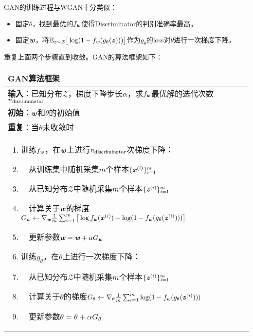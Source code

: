 GAN的训练过程与WGAN十分类似：
\begin{itemize}
	\setlength{\itemsep}{0pt}
    \setlength{\parsep}{0pt}
    \setlength{\parskip}{0pt}
    \item 固定$\theta$，找到最优的$f_{\boldsymbol{\mathit{w}}}$使得Discriminator的判别准确率最高。
    \item 固定$\boldsymbol{\mathit{w}}$，将$\mathbb{E}_{\boldsymbol{\mathit{z}}\sim\mathcal{Z}}\big{[}\log(1-f_{\boldsymbol{\mathit{w}}}(g_{\theta}(\boldsymbol{\mathit{z}})))\big{]}$作为$g_{\theta}$的loss对$\theta$进行一次梯度下降。
\end{itemize}
重复上面两个步骤直到收敛。GAN的算法框架如下：
\begin{center}
\begin{tabularx}{\textwidth}{X}
\toprule 
\textbf{{GAN}算法框架}\\
\midrule
\textbf{输入}：已知分布$\mathcal{Z}$，梯度下降步长$\alpha$，求$f_{\boldsymbol{\mathit{w}}}$最优解的迭代次数$n_{\rm{discriminator}}$\\
\textbf{初始}：$\boldsymbol{\mathit{w}}$和$\theta$的初始值\\
\textbf{重复}：当$\theta$未收敛时\\
\parbox{1\textwidth}{\begin{enumerate}[topsep=0pt]
    \setlength{\itemsep}{0pt}
    \setlength{\parsep}{0pt}
    \setlength{\parskip}{0pt}
    \item 训练$f_{\boldsymbol{\mathit{w}}}$，在$\boldsymbol{\mathit{w}}$上进行$n_{\rm{discriminator}}$次梯度下降：
    \item $\quad$从训练集中随机采集$m$个样本$\{\boldsymbol{\mathit{x}}^{(i)}\}_{i=1}^{m}$
    \item $\quad$从已知分布$\mathcal{Z}$中随机采集$m$个样本$\{\boldsymbol{\mathit{z}}^{(i)}\}_{i=1}^{m}$
    \item $\quad$计算关于$\boldsymbol{\mathit{w}}$的梯度$G_{\boldsymbol{\mathit{w}}}\gets\nabla_{\boldsymbol{\mathit{w}}}\frac{1}{m}\sum_{i=1}^{m}\big{[} \log f_{\boldsymbol{\mathit{w}}}(\boldsymbol{\mathit{x}}^{(i)})+\log(1-f_{\boldsymbol{\mathit{w}}}(g_{\theta}(\boldsymbol{\mathit{z}}^{(i)}))) \big{]}$
    \item $\quad$更新参数$\boldsymbol{\mathit{w}}=\boldsymbol{\mathit{w}} + \alpha G_{\boldsymbol{\mathit{w}}}$
    \item 训练$g_{\theta}$，在$\theta$上进行一次梯度下降：
    \item $\quad$从已知分布$\mathcal{Z}$中随机采集$m$个样本$\{\boldsymbol{\mathit{z}}^{(i)}\}_{i=1}^{m}$
    \item $\quad$计算关于$\theta$的梯度$G_{\theta}\gets\nabla_{\theta}\frac{1}{m}\sum_{i=1}^{m}\log(1-f_{\boldsymbol{\mathit{w}}}(g_{\theta}(\boldsymbol{\mathit{z}}^{(i)})))$
    \item $\quad$更新参数$\theta=\theta + \alpha G_{\theta}$
\end{enumerate}}\\\bottomrule
\end{tabularx}
\end{center}

